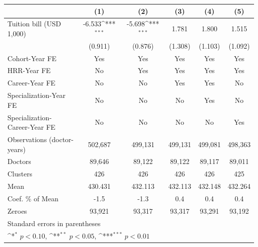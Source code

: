 {
\def\sym#1{\ifmmode^{#1}\else\(^{#1}\)\fi}
\begin{tabular}{l*{5}{c}}
\hline\hline
                    &\multicolumn{1}{c}{(1)}         &\multicolumn{1}{c}{(2)}         &\multicolumn{1}{c}{(3)}         &\multicolumn{1}{c}{(4)}         &\multicolumn{1}{c}{(5)}         \\
\hline
Tuition bill (USD 1,000)&      -6.533\sym{***}&      -5.698\sym{***}&       1.781         &       1.800         &       1.515         \\
                    &     (0.911)         &     (0.876)         &     (1.308)         &     (1.103)         &     (1.092)         \\
[1em]
Cohort-Year FE      &         Yes         &         Yes         &         Yes         &         Yes         &         Yes         \\
[1em]
HRR-Year FE         &          No         &         Yes         &         Yes         &         Yes         &         Yes         \\
[1em]
Career-Year FE      &          No         &          No         &         Yes         &         Yes         &          No         \\
[1em]
Specialization-Year FE&          No         &          No         &          No         &         Yes         &          No         \\
[1em]
Specialization-Career-Year FE&          No         &          No         &          No         &          No         &         Yes         \\
\hline
Observations (doctor-years)&     502,687         &     499,131         &     499,131         &     499,081         &     498,363         \\
Doctors             &      89,646         &      89,122         &      89,122         &      89,117         &      89,011         \\
Clusters            &         426         &         426         &         426         &         426         &         425         \\
Mean                &     430.431         &     432.113         &     432.113         &     432.148         &     432.264         \\
Coef. \% of Mean    &        -1.5         &        -1.3         &         0.4         &         0.4         &         0.4         \\
Zeroes              &      93,921         &      93,317         &      93,317         &      93,291         &      93,192         \\
\hline\hline
\multicolumn{6}{l}{\footnotesize Standard errors in parentheses}\\
\multicolumn{6}{l}{\footnotesize \sym{*} \(p<0.10\), \sym{**} \(p<0.05\), \sym{***} \(p<0.01\)}\\
\end{tabular}
}
